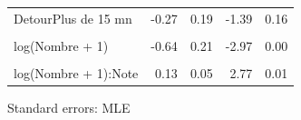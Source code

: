 \documentclass[
]{book}
\begin{document}
\begin{table}[!h]
\begin{threeparttable}
\begin{tabular}{lrrrr}
DetourPlus de 15 mn & -0.27 & 0.19 & -1.39 & 0.16\\
\cellcolor{gray!6}{AutorouteOui} & \cellcolor{gray!6}{0.50} & \cellcolor{gray!6}{0.11} & \cellcolor{gray!6}{4.50} & \cellcolor{gray!6}{0.00}\\
log(Nombre + 1) & -0.64 & 0.21 & -2.97 & 0.00\\
\addlinespace
\cellcolor{gray!6}{Note} & \cellcolor{gray!6}{0.00} & \cellcolor{gray!6}{0.11} & \cellcolor{gray!6}{0.01} & \cellcolor{gray!6}{0.99}\\
log(Nombre + 1):Note & 0.13 & 0.05 & 2.77 & 0.01\\
\bottomrule
\end{tabular}
\begin{tablenotes}
\item Standard errors: MLE
\end{tablenotes}
\end{threeparttable}
\end{table}
\end{document}
